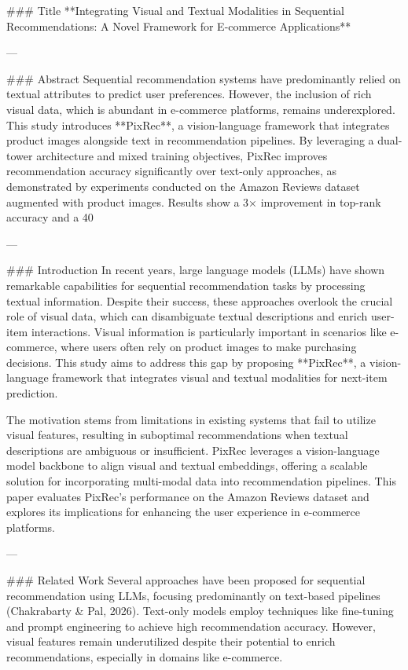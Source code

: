 ### Title  
**Integrating Visual and Textual Modalities in Sequential Recommendations: A Novel Framework for E-commerce Applications**

---

### Abstract  
Sequential recommendation systems have predominantly relied on textual attributes to predict user preferences. However, the inclusion of rich visual data, which is abundant in e-commerce platforms, remains underexplored. This study introduces **PixRec**, a vision-language framework that integrates product images alongside text in recommendation pipelines. By leveraging a dual-tower architecture and mixed training objectives, PixRec improves recommendation accuracy significantly over text-only approaches, as demonstrated by experiments conducted on the Amazon Reviews dataset augmented with product images. Results show a 3× improvement in top-rank accuracy and a 40%

---

### Introduction  
In recent years, large language models (LLMs) have shown remarkable capabilities for sequential recommendation tasks by processing textual information. Despite their success, these approaches overlook the crucial role of visual data, which can disambiguate textual descriptions and enrich user-item interactions. Visual information is particularly important in scenarios like e-commerce, where users often rely on product images to make purchasing decisions. This study aims to address this gap by proposing **PixRec**, a vision-language framework that integrates visual and textual modalities for next-item prediction.  

The motivation stems from limitations in existing systems that fail to utilize visual features, resulting in suboptimal recommendations when textual descriptions are ambiguous or insufficient. PixRec leverages a vision-language model backbone to align visual and textual embeddings, offering a scalable solution for incorporating multi-modal data into recommendation pipelines. This paper evaluates PixRec's performance on the Amazon Reviews dataset and explores its implications for enhancing the user experience in e-commerce platforms.  

---

### Related Work  
Several approaches have been proposed for sequential recommendation using LLMs, focusing predominantly on text-based pipelines (Chakrabarty & Pal, 2026). Text-only models employ techniques like fine-tuning and prompt engineering to achieve high recommendation accuracy. However, visual features remain underutilized despite their potential to enrich recommendations, especially in domains like e-commerce.  

